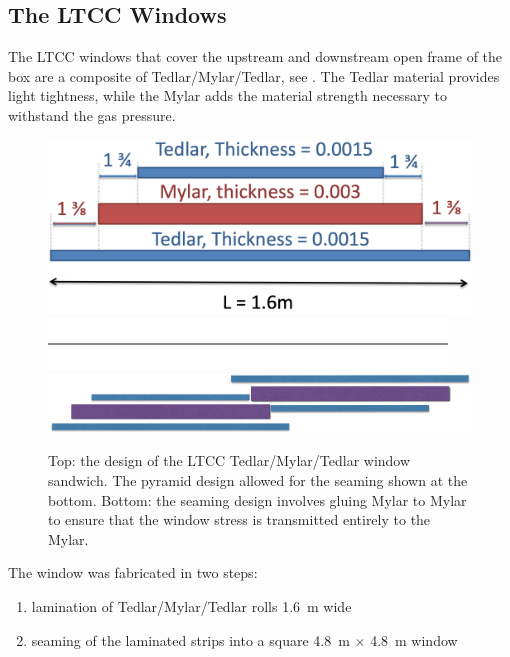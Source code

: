 \subsection{The LTCC Windows}

The LTCC windows that cover the upstream and downstream open frame of the box are a composite of
Tedlar/Mylar/Tedlar, see . The Tedlar
material provides light tightness, while the Mylar adds the material strength necessary to withstand the gas pressure.

\begin{figure}
	\centering
	\includegraphics[width=1.0\columnwidth, keepaspectratio]{img/windowDesign.png}
	\includegraphics[width=1.0\columnwidth, keepaspectratio]{img/blank.png}
	\includegraphics[width=1.0\columnwidth, keepaspectratio]{img/windowSeaming.png}
	\caption{Top: the design of the LTCC Tedlar/Mylar/Tedlar window sandwich. The pyramid design allowed for the seaming shown at the bottom.
			 Bottom: the seaming design involves gluing Mylar to Mylar to ensure that the window stress is transmitted entirely to the Mylar. }
	\label{fig:windowDesign}
\end{figure}

The window was fabricated in two steps:

\begin{enumerate}
	\item lamination of Tedlar/Mylar/Tedlar rolls 1.6~m  wide
	\item seaming of the laminated strips into a square 4.8~m $\times$ 4.8~m window
\end{enumerate}

